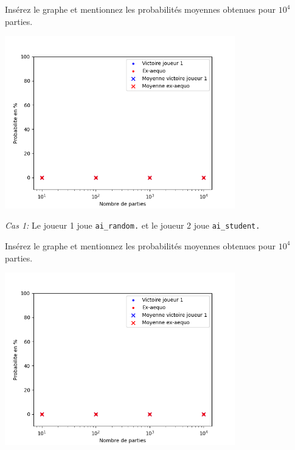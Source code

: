 \documentclass[11pt,answers]{exam}
\begin{document}
\begin{solutionbox}{100mm}
	Insérez le graphe et mentionnez les probabilités moyennes obtenues pour $10^4$ parties.

	\centering
	\includegraphics[width=0.75\textwidth]{MCplot_empty.png}
\end{solutionbox}

\medskip

\emph{Cas 1:} Le joueur 1 joue \texttt{ai\_random.} et le joueur 2 joue \texttt{ai\_student.}

\begin{solutionbox}{100mm}
	Insérez le graphe et mentionnez les probabilités moyennes obtenues pour $10^4$ parties.

	\centering
	\includegraphics[width=0.75\textwidth]{MCplot_empty.png}
\end{solutionbox}
\end{document}
